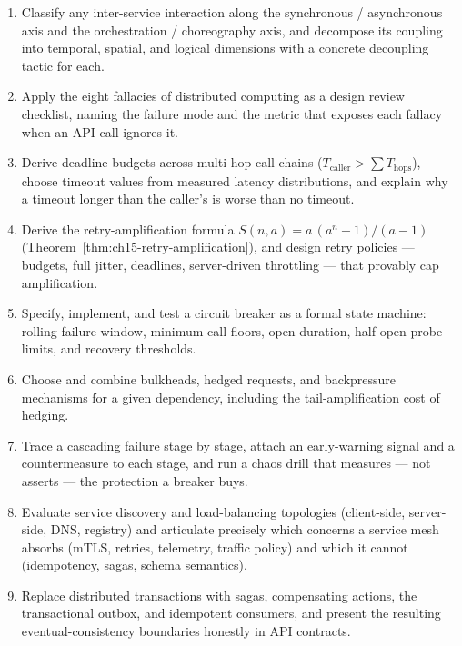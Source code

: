 \begin{enumerate}[label=\textbf{LO-\arabic*.}, leftmargin=2.6cm]
  \item Classify any inter-service interaction along the synchronous /
        asynchronous axis and the orchestration / choreography axis, and
        decompose its coupling into temporal, spatial, and logical
        dimensions with a concrete decoupling tactic for each.
  \item Apply the eight fallacies of distributed computing as a design
        review checklist, naming the failure mode and the metric that
        exposes each fallacy when an API call ignores it.
  \item Derive deadline budgets across multi-hop call chains
        ($T_{\text{caller}} > \sum T_{\text{hops}}$), choose timeout values
        from measured latency distributions, and explain why a timeout
        longer than the caller's is worse than no timeout.
  \item Derive the retry-amplification formula
        $S(n, a) = a\,(a^{n}-1)/(a-1)$
        (Theorem~\ref{thm:ch15-retry-amplification}), and design retry
        policies --- budgets, full jitter, deadlines, server-driven
        throttling --- that provably cap amplification.
  \item Specify, implement, and test a circuit breaker as a formal state
        machine: rolling failure window, minimum-call floors, open
        duration, half-open probe limits, and recovery thresholds.
  \item Choose and combine bulkheads, hedged requests, and backpressure
        mechanisms for a given dependency, including the tail-amplification
        cost of hedging.
  \item Trace a cascading failure stage by stage, attach an early-warning
        signal and a countermeasure to each stage, and run a chaos drill
        that measures --- not asserts --- the protection a breaker buys.
  \item Evaluate service discovery and load-balancing topologies
        (client-side, server-side, DNS, registry) and articulate precisely
        which concerns a service mesh absorbs (mTLS, retries, telemetry,
        traffic policy) and which it cannot (idempotency, sagas, schema
        semantics).
  \item Replace distributed transactions with sagas, compensating actions,
        the transactional outbox, and idempotent consumers, and present the
        resulting eventual-consistency boundaries honestly in API contracts.
\end{enumerate}

